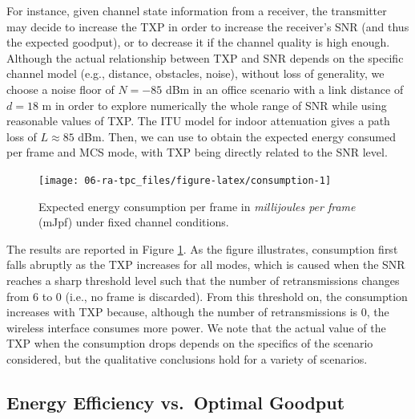 \documentclass[twoside,nohyper]{tufte-book}
\makeatletter
\let\orig@maketag@@@\maketag@@@
\renewcommand{\eqref}[1]{\textup{\let\maketag@@@\orig@maketag@@@\tagform@{\ref{#1}}}}
\def\maketag@@@#1{\hbox{\rlap{\kern\marginparsep\m@th\normalfont#1}\kern1sp}}
\theoremstyle{definition}
\theoremstyle{definition}
\theoremstyle{definition}
\theoremstyle{remark}
\makeatother
\begin{document}
For instance, given channel state information from a receiver, the
transmitter may decide to increase the TXP in order to increase the
receiver's SNR (and thus the expected goodput), or to decrease it if the
channel quality is high enough. Although the actual relationship between
TXP and SNR depends on the specific channel model (e.g., distance,
obstacles, noise), without loss of generality, we choose a noise floor
of \(N=-85\) dBm in an office scenario with a link distance of \(d=18\)
m in order to explore numerically the whole range of SNR while using
reasonable values of TXP. The ITU model for indoor
attenuation\cite[-10mm]{iturp1238-2015}
gives a path loss of \(L\approx 85\) dBm. Then, we can use
\eqref{eq:energyperframe} to obtain the expected energy consumed per frame
and MCS mode, with TXP being directly related to the SNR level.




\begin{figure}

{\centering \texttt{[image: 06-ra-tpc\_files/figure-latex/consumption-1]} 

}

\caption[Expected energy consumption per frame in
\emph{millijoules per frame} (mJpf) under fixed channel conditions.]{Expected energy consumption per frame in
\emph{millijoules per frame} (mJpf) under fixed channel conditions.}\label{fig:consumption}
\end{figure}

The results are reported in Figure \ref{fig:consumption}. As the figure
illustrates, consumption first falls abruptly as the TXP increases for
all modes, which is caused when the SNR reaches a sharp threshold level
such that the number of retransmissions changes from 6 to 0 (i.e., no
frame is discarded). From this threshold on, the consumption increases
with TXP because, although the number of retransmissions is 0, the
wireless interface consumes more power. We note that the actual value of
the TXP when the consumption drops depends on the specifics of the
scenario considered, but the qualitative conclusions hold for a variety
of scenarios.

\hypertarget{energy-efficiency-vs.optimal-goodput}{%
\subsection{Energy Efficiency vs.~Optimal
Goodput}\label{energy-efficiency-vs.optimal-goodput}}
\end{document}
